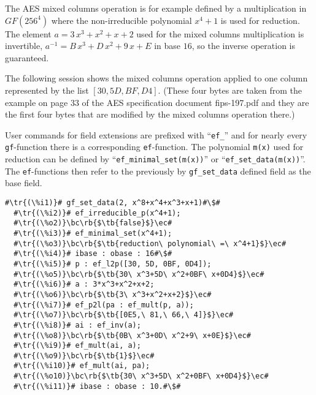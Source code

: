 \documentclass[a4paper,11pt,leqno,fleqn]{artikel3}
\newcommand{\bc}{\begin{center}}
\newcommand{\ec}{\end{center}}
\newcommand{\tr}[1]{\textcolor{red}{#1}}
\newcommand{\tb}[1]{\textcolor{blue}{#1}}
\newcommand{\rb}[1]{\raisebox{2mm}[0mm][1mm]{#1}}
\begin{document}
The AES mixed columns operation is for example defined by a multiplication 
in $GF(256^4)$ where the non-irreducible polynomial $x^4+1$ is used for reduction. 
The element $a = 3\,x^3+x^2+x+2$ used for the mixed columns multiplication is invertible,  
$a^{-1} = B\,x^3+D\,x^2+9\,x+E$ in base $16$, so the inverse operation is guaranteed. 

The following session shows the mixed columns operation applied to one column represented 
by the list $[30, 5D, BF, D4]$. (These four bytes are taken from the example on page 33 of the 
AES specification document fips-197.pdf and they are the first four bytes that are modified 
by the mixed columns operation there.) 

User commands for field extensions are prefixed with ``\verb!ef_!'' and for nearly every 
\texttt{gf}-function there is a corresponding \texttt{ef}-function.
The polynomial \texttt{m(x)} used for reduction can be defined by 
``\verb!ef_minimal_set(m(x))!'' or ``\verb!ef_set_data(m(x))!''.
The \texttt{ef}-functions then refer to the 
previously by \texttt{gf\_set\_data} defined field as the base field. 

\vspace*{4mm}
\begin{lstlisting}[escapechar=\#]
  #\tr{(\%i1)}# gf_set_data(2, x^8+x^4+x^3+x+1)#\$#
  #\tr{(\%i2)}# ef_irreducible_p(x^4+1);
  #\tr{(\%o2)}\bc\rb{$\tb{false}$}\ec#
  #\tr{(\%i3)}# ef_minimal_set(x^4+1);
  #\tr{(\%o3)}\bc\rb{$\tb{reduction\ polynomial\ =\ x^4+1}$}\ec#
  #\tr{(\%i4)}# ibase : obase : 16#\$#
  #\tr{(\%i5)}# p : ef_l2p([30, 5D, 0BF, 0D4]);
  #\tr{(\%o5)}\bc\rb{$\tb{30\ x^3+5D\ x^2+0BF\ x+0D4}$}\ec#
  #\tr{(\%i6)}# a : 3*x^3+x^2+x+2;
  #\tr{(\%o6)}\bc\rb{$\tb{3\ x^3+x^2+x+2}$}\ec#
  #\tr{(\%i7)}# ef_p2l(pa : ef_mult(p, a));
  #\tr{(\%o7)}\bc\rb{$\tb{[0E5,\ 81,\ 66,\ 4]}$}\ec#
  #\tr{(\%i8)}# ai : ef_inv(a);
  #\tr{(\%o8)}\bc\rb{$\tb{0B\ x^3+0D\ x^2+9\ x+0E}$}\ec#
  #\tr{(\%i9)}# ef_mult(ai, a);
  #\tr{(\%o9)}\bc\rb{$\tb{1}$}\ec#
  #\tr{(\%i10)}# ef_mult(ai, pa);
  #\tr{(\%o10)}\bc\rb{$\tb{30\ x^3+5D\ x^2+0BF\ x+0D4}$}\ec#
  #\tr{(\%i11)}# ibase : obase : 10.#\$#
\end{lstlisting}
\end{document}

